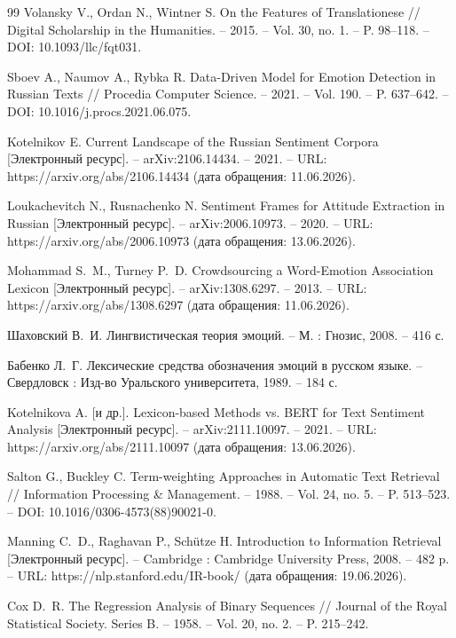 \documentclass[12pt,a4paper]{report}
\providecommand{\url}[1]{#1}
\begin{document}
\begin{thebibliography}{99}
Volansky V., Ordan N., Wintner S. On the Features of Translationese // Digital Scholarship in the Humanities. -- 2015. -- Vol. 30, no. 1. -- P. 98--118. -- DOI: 10.1093/llc/fqt031.

Sboev A., Naumov A., Rybka R. Data-Driven Model for Emotion Detection in Russian Texts // Procedia Computer Science. -- 2021. -- Vol. 190. -- P. 637--642. -- DOI: 10.1016/j.procs.2021.06.075.

Kotelnikov E. Current Landscape of the Russian Sentiment Corpora [Электронный ресурс]. -- arXiv:2106.14434. -- 2021. -- URL: \url{https://arxiv.org/abs/2106.14434} (дата обращения: 11.06.2026).

Loukachevitch N., Rusnachenko N. Sentiment Frames for Attitude Extraction in Russian [Электронный ресурс]. -- arXiv:2006.10973. -- 2020. -- URL: \url{https://arxiv.org/abs/2006.10973} (дата обращения: 13.06.2026).

Mohammad S.~M., Turney P.~D. Crowdsourcing a Word-Emotion Association Lexicon [Электронный ресурс]. -- arXiv:1308.6297. -- 2013. -- URL: \url{https://arxiv.org/abs/1308.6297} (дата обращения: 11.06.2026).

Шаховский В.~И. Лингвистическая теория эмоций. -- М. : Гнозис, 2008. -- 416 с.

Бабенко Л.~Г. Лексические средства обозначения эмоций в русском языке. -- Свердловск : Изд-во Уральского университета, 1989. -- 184 с.

Kotelnikova A. [и др.]. Lexicon-based Methods vs. BERT for Text Sentiment Analysis [Электронный ресурс]. -- arXiv:2111.10097. -- 2021. -- URL: \url{https://arxiv.org/abs/2111.10097} (дата обращения: 13.06.2026).

Salton G., Buckley C. Term-weighting Approaches in Automatic Text Retrieval // Information Processing \& Management. -- 1988. -- Vol. 24, no. 5. -- P. 513--523. -- DOI: 10.1016/0306-4573(88)90021-0.

Manning C.~D., Raghavan P., Sch{\"u}tze H. Introduction to Information Retrieval [Электронный ресурс]. -- Cambridge : Cambridge University Press, 2008. -- 482 p. -- URL: \url{https://nlp.stanford.edu/IR-book/} (дата обращения: 19.06.2026).

Cox D.~R. The Regression Analysis of Binary Sequences // Journal of the Royal Statistical Society. Series B. -- 1958. -- Vol. 20, no. 2. -- P. 215--242.


\end{thebibliography}
\end{document}
